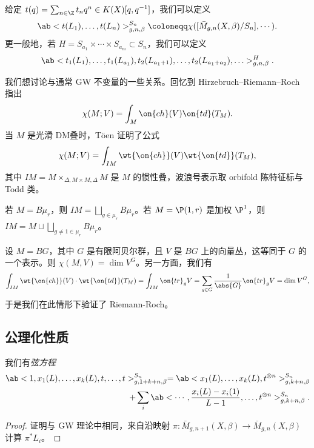 给定 \(t(q) = \sum_{n \in \Z} t_n q^n \in K(X)[q,q^{-1}]\)，我们可以定义
\[ \ab< t(L_1), \ldots, t(L_n)>^{S_n}_{g,n,\beta} \coloneqq \chi ([\bar{M}_{g,n}(X,\beta)/S_n], \cdots). \]
更一般地，若 \(H = S_{a_1} \times \cdots \times S_{a_m} \subset S_n\)，我们可以定义
\[ \ab<t_1(L_1), \ldots, t_1(L_{a_1}), t_2(L_{a_1+1}), \ldots, t_2(L_{a_1+a_2}), \ldots>_{g,n,\beta}^H. \]

\begin{rmk}
    我们想讨论与通常 GW 不变量的一些关系。回忆到 Hirzebruch--Riemann--Roch 指出
    \[ \chi(M; V) = \int_M \on{ch}(V) \on{td}(T_M). \]
    当 \(M\) 是光滑 DM叠时，T\"oen 证明了公式
    \[ \chi(M; V) = \int_{IM} \wt{\on{ch}}(V) \wt{\on{td}}(T_M), \]
    其中 \(IM = M \times_{\Delta, M \times M, \Delta} M\) 是 \(M\) 的惯性叠，波浪号表示取 orbifold 陈特征标与 Todd 类。 
\end{rmk}

\begin{exm}
    若 \(M = B\mu_r\)，则 \(IM = \bigsqcup_{g \in \mu_r} B \mu_r\)。若 \(M = \P(1, r)\) 是加权 \(\P^1\)，则 \(IM = M \sqcup \bigsqcup_{g \neq 1 \in \mu_r} B\mu_r\)。    
\end{exm}

\begin{exm}
    设 \(M = BG\)，其中 \(G\) 是有限阿贝尔群，且 \(V\) 是 \(BG\) 上的向量丛，这等同于 \(G\) 的一个表示。则 \(\chi(M, V) = \dim V^G\)。另一方面，我们有
    \[ \int_{IM} \wt{\on{ch}}(V) \cdot \wt{\on{td}}(T_M) = \int_{IM} \on{tr}_g V = \sum_{g \in G} \frac{1}{\abs{G}} \on{tr}_g V = \dim V^G, \]
    于是我们在此情形下验证了 Riemann-Roch。
\end{exm}

\subsection{公理化性质}%
\label{sub:Axiomatic properties}

\begin{lem}
    我们有\textit{弦方程}
    \begin{align*}
        \ab< 1, x_1(L), \ldots, x_k(L), t, \ldots, t >_{g, 1+k+n, \beta}^{S_n} = \ab<x_1(L), \ldots, x_k(L), t^{\otimes n}>^{S_n}_{g,k+n,\beta} \\
        + \sum_i \ab< \cdots, \frac{x_i(L) - x_i(1)}{L-1}, \ldots, t^{\otimes n}>^{S_n}_{g,k+n,\beta}. 
    \end{align*}
\end{lem}

\begin{proof}
    证明与 GW 理论中相同，来自沿映射 \(\pi \colon\bar{M}_{g,n+1}(X,\beta) \to \bar{M}_{g,n}(X,\beta)\) 计算 \(\pi^* L_i\)。
\end{proof}

